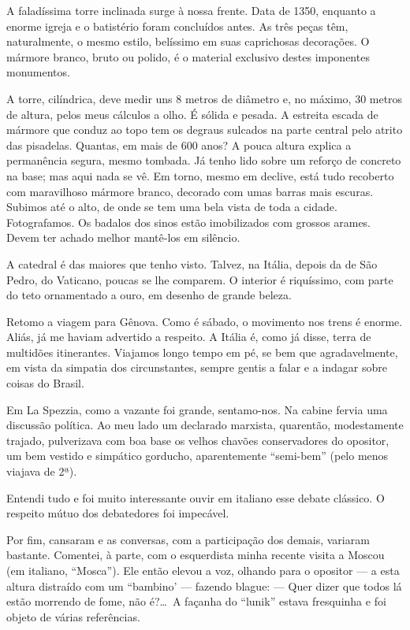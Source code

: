 A faladíssima torre inclinada surge à nossa frente. Data de 1350, enquanto a enorme igreja e o batistério foram concluídos antes. As três peças têm, naturalmente, o mesmo estilo, belíssimo em suas caprichosas decorações. O mármore branco, bruto ou polido, é o material exclusivo destes imponentes monumentos.

A torre, cilíndrica, deve medir uns 8 metros de diâmetro e, no máximo, 30 metros de altura, pelos meus cálculos a olho. É sólida e pesada. A estreita escada de mármore que conduz ao topo tem os degraus sulcados na parte central pelo atrito das pisadelas. Quantas, em mais de 600 anos? A pouca altura explica a permanência segura, mesmo tombada. Já tenho lido sobre um reforço de concreto na base; mas aqui nada se vê. Em torno, mesmo em declive, está tudo recoberto com maravilhoso mármore branco, decorado com umas barras mais escuras. Subimos até o alto, de onde se tem uma bela vista de toda a cidade. Fotografamos. Os badalos dos sinos estão imobilizados com grossos arames. Devem ter achado melhor mantê-los em silêncio.

A catedral é das maiores que tenho visto. Talvez, na Itália, depois da de São Pedro, do Vaticano, poucas se lhe comparem. O interior é riquíssimo, com parte do teto ornamentado a ouro, em desenho de grande beleza.

Retomo a viagem para Gênova. Como é sábado, o movimento nos trens é enorme. Aliás, já me haviam advertido a respeito. A Itália é, como já disse, terra de multidões itinerantes. Viajamos longo tempo em pé, se bem que agradavelmente, em vista da simpatia dos circunstantes, sempre gentis a falar e a indagar sobre coisas do Brasil.

Em La Spezzia, como a vazante foi grande, sentamo-nos. Na cabine fervia uma discussão política. Ao meu lado um declarado marxista, quarentão, modestamente trajado, pulverizava com boa base os velhos chavões conservadores do opositor, um bem vestido e simpático gorducho, aparentemente ``semi-bem'' (pelo menos viajava de 2ª).

Entendi tudo e foi muito interessante ouvir em italiano esse debate clássico. O respeito mútuo dos debatedores foi impecável.

Por fim, cansaram e as conversas, com a participação dos demais, variaram bastante. Comentei, à parte, com o esquerdista minha recente visita a Moscou (em italiano, ``Mosca''). Ele então elevou a voz, olhando para o opositor --- a esta altura distraído com um ``bambino’ --- fazendo blague: --- Quer dizer que todos lá estão morrendo de fome, não é?\ldots\ A façanha do ``lunik'' estava fresquinha e foi objeto de várias referências.

